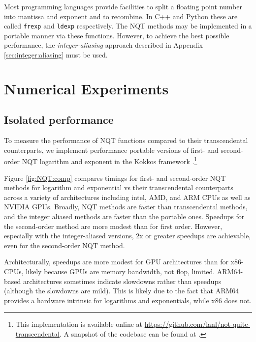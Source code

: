 \documentclass[linenumbers,twocolumn]{aastex631}
\newcommand{\mynote}[3]{
  \textcolor{#2}{\fbox{\bfseries\sffamily\scriptsize#1}}
    {\small$\blacktriangleright$\textsf{\emph{#3}}$\blacktriangleleft$}
}
\newcommand{\jf}[1]{\mynote{JF}{green}{#1}}
\newcommand{\jmm}[1]{\mynote{JMM}{blue}{#1}}
\begin{document}
Most programming languages provide facilities to split a floating point number into mantissa and exponent and to recombine. In C++ and Python these are called {\tt frexp} and {\tt ldexp} respectively. The NQT methods may be implemented in a portable manner via these functions. However, to achieve the best possible performance, the \textit{integer-aliasing} approach described in Appendix \ref{sec:integer:aliasing} must be used.

\section{Numerical Experiments}
\label{sec:numexperiments}

\subsection{Isolated performance}
\label{sec:experiment:performance}

To measure the performance of NQT functions compared to their transcendental counterparts, we implement performance portable versions of first- and second-order NQT logarithm and exponent in the Kokkos framework \citep{Kokkos}.\footnote{This implementation is available online at \url{https://github.com/lanl/not-quite-transcendental}. A snapshot of the codebase can be found at \citet{NQTRepoZenodo}.}

Figure \ref{fig:NQT:comp} compares timings for first- and second-order NQT methods for logarithm and exponential vs their transcendental counterparts across a variety of architectures including intel, AMD, and ARM CPUs as well as NVIDIA GPUs. Broadly, NQT methods are faster than transcendental methods, and the integer aliased methods are faster than the portable ones. Speedups for the second-order method are more modest than for first order. However, especially with the integer-aliased versions, 2x or greater speedups are achievable, even for the second-order NQT method.

Architecturally, speedups are more modest for GPU architectures than for x86-CPUs, likely because GPUs are memory bandwidth, not flop, limited. ARM64-based architectures sometimes indicate slowdowns rather than speedups (although the slowdowns are mild). This is likely due to the fact that ARM64 provides a hardware intrinsic for logarithms and exponentials, while x86 does not.
\end{document}
